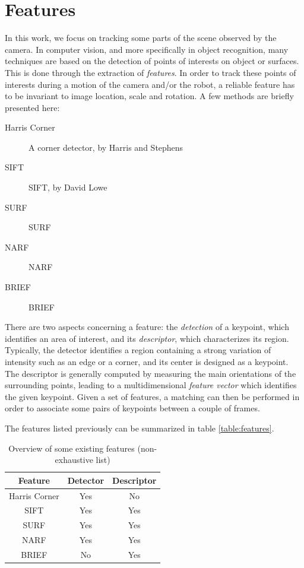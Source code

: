 \section{Features}

In this work, we focus on tracking some parts of the scene observed by the camera. In computer vision, and more specifically in object recognition, many techniques are based on the detection of points of interests on object or surfaces. This is done through the extraction of \emph{features}. In order to track these points of interests during a motion of the camera and/or the robot, a reliable feature has to be invariant to image location, scale and rotation. A few methods are briefly presented here:

\begin{description}
\item[Harris Corner] A corner detector, by Harris and Stephens~\cite{Harris88alvey}
\item[\acrshort{SIFT}]\acrlong{SIFT}, by David Lowe~\cite{lowe_2004_sift} 
\item[\acrshort{SURF}]\acrlong{SURF}~\cite{surf}
\item[\acrshort{NARF}]\acrlong{NARF}~\cite{steder10irosws}
\item[\acrshort{BRIEF}]\acrlong{BRIEF}~\cite{Calonder10-brief}
\end{description}

There are two aspects concerning a feature: the \emph{detection} of a keypoint, which identifies an area of interest, and its \emph{descriptor}, which characterizes its region. Typically, the detector identifies a region containing a strong variation of intensity such as an edge or a corner, and its center is designed as a keypoint. The descriptor is generally computed by measuring the main orientations of the surrounding points, leading to a multidimensional \emph{feature vector} which identifies the given keypoint. Given a set of features, a matching can then be performed in order to associate some pairs of keypoints between a couple of frames.

\clearpage
The features listed previously can be summarized in table \ref{table:features}.

\begin{table}[H]
 \centering
  \begin{tabular}{c|cc}
  \hline
  Feature & Detector & Descriptor \\
  \hline
  Harris Corner & Yes & No \\
  SIFT & Yes & Yes \\
  SURF & Yes & Yes \\
  NARF & Yes & Yes \\
  BRIEF & No & Yes \\
  \hline
  \end{tabular}
 \caption {Overview of some existing features (non-exhaustive list)}
 \label{tab:features}
\end{table}


